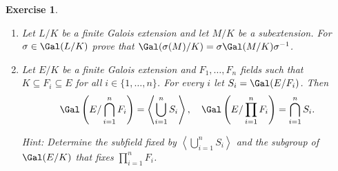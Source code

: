 \documentclass[a4paper,10pt,reqno]{amsart}
\newtheorem{ex}{Exercise}[section]
\begin{document}
\begin{ex}
\label{8.1}~

    \begin{enumerate}[label=(\roman*)]
    \item Let $L/K$ be a finite Galois extension and let $M/K$ be a subextension.
    For $\sigma \in \Gal(L/K)$ prove that $\Gal(\sigma(M)/K) = \sigma\Gal(M/K)\sigma^{-1}$.
    
    \item Let $E/K$ be a finite Galois extension 
    and $F_1,\dots,F_n$ fields 
    such that $K\subseteq F_i\subseteq E$ for 
    all $i\in\{1,\dots,n\}$. For every 
    $i$ let $S_i=\Gal(E/F_i)$. Then
    \[
    \Gal\left(E/\bigcap_{i=1}^nF_i\right)=\left\langle\bigcup_{i=1}^nS_i\right\rangle,
    \quad
    \Gal\left(E/\prod_{i=1}^nF_i\right)=\bigcap_{i=1}^nS_i.
    \]

    \noindent \textit{Hint:} Determine the subfield fixed by $\left\langle\bigcup_{i=1}^nS_i\right\rangle$ and the subgroup of $\Gal(E/K)$ that fixes $\prod_{i=1}^nF_i$.
    \end{enumerate}
\end{ex}
\end{document}
